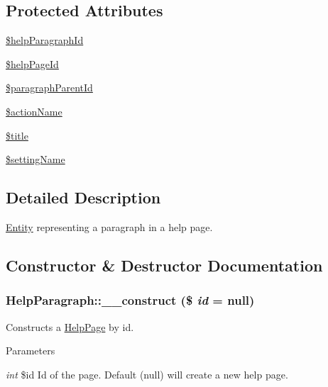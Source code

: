 \subsection*{Protected Attributes}
\begin{DoxyCompactItemize}
\item 
\hyperlink{classHelpParagraph_a7ebe26d022e78fa7c5749935438cd39a}{\$helpParagraphId}
\item 
\hyperlink{classHelpParagraph_ac2f1ef24128c66ac5beca2e001d17e03}{\$helpPageId}
\item 
\hyperlink{classHelpParagraph_a005ed945a6d04638d7a527a954460e97}{\$paragraphParentId}
\item 
\hyperlink{classHelpParagraph_a0d0e5d452241543ab13527e21e1605c6}{\$actionName}
\item 
\hyperlink{classHelpParagraph_aa69b836e4409f2517ed43a368306f160}{\$title}
\item 
\hyperlink{classHelpParagraph_af1f55a039eab9e5317aaaf4ba7763c99}{\$settingName}
\end{DoxyCompactItemize}


\subsection{Detailed Description}
\hyperlink{classEntity}{Entity} representing a paragraph in a help page. 

\subsection{Constructor \& Destructor Documentation}
\hypertarget{classHelpParagraph_a1f77bc76e254790960abd99764d788f7}{
\subsubsection[{\_\-\_\-construct}]{\setlength{\rightskip}{0pt plus 5cm}HelpParagraph::\_\-\_\-construct (\$ {\em id} = {\ttfamily null})}}
\label{classHelpParagraph_a1f77bc76e254790960abd99764d788f7}
Constructs a \hyperlink{classHelpPage}{HelpPage} by id.


\begin{DoxyParams}{Parameters}
\item[{\em int}]\$id Id of the page. Default (null) will create a new help page. \end{DoxyParams}


